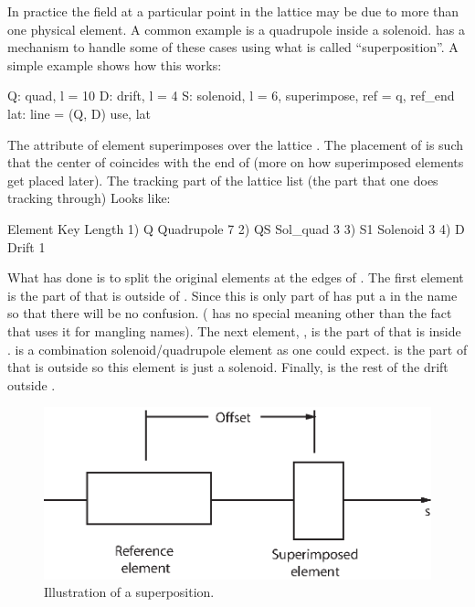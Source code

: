 In practice the field at a particular point in the lattice may be due
to more than one physical element. A common example is a quadrupole
inside a solenoid. \bmad has a mechanism to handle some of these
cases using what is called ``superposition''. A simple example shows
how this works:
\begin{example}
  Q: quad, l = 10
  D: drift, l = 4
  S: solenoid, l = 6, superimpose, ref = q, ref_end
  lat: line = (Q, D)
  use, lat
\end{example}
The  attribute of element  superimposes 
over the lattice . The placement of  is such that the
center of  coincides with the end of  (more on how
superimposed elements get placed later). The tracking part of the
lattice list (the part that one does tracking through) Looks like:
\begin{example}
        Element   Key         Length
  1)    Q{\B}        Quadrupole   7
  2)    Q{\B}S       Sol_quad     3
  3)    S{\B}1       Solenoid     3
  4)    D{\B}        Drift        1
\end{example}
What \bmad has done is to split the original elements  at
the edges of .  The first element  is the part of 
that is outside of . Since this is only part of  \bmad
has put a \vn{\B} in the name so that there will be no confusion.
(\vn{\B} has no special meaning other than the fact that \bmad uses
it for mangling names). The next element, , is the part of
 that is inside .  is a combination
solenoid/quadrupole element as one could expect.  is the part
of  that is outside  so this element is just a
solenoid. Finally,  is the rest of the drift outside .

\begin{figure}[tb]
\centering 
\includegraphics{superimpose.eps} 
\caption[Superposition Illustration.]
{Illustration of a superposition.}
\label{f:superimpose}
\end{figure}

